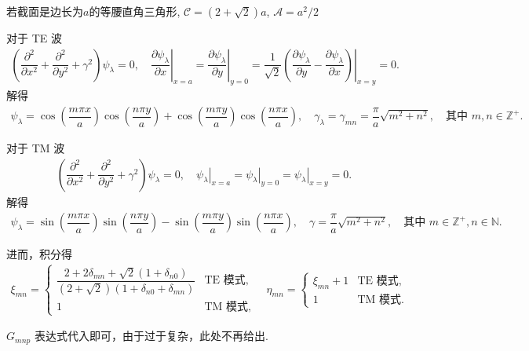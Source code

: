 \begin{exbox}
	若截面是边长为\(a\)的等腰直角三角形,  \(\mathcal{C} = (2 + \sqrt{2})a\), \(\mathcal{A} = a^2/2\)

	对于 TE 波
	\begin{align*}
		\left( \dfrac{\partial^2}{\partial x^2} + \dfrac{\partial^2}{\partial y^2} + \gamma^2 \right) \psi_\lambda = 0, \quad \left. \dfrac{\partial \psi_\lambda}{\partial x} \right|_{x=a} = \left. \dfrac{\partial \psi_\lambda}{\partial y} \right|_{y=0} = \left. \dfrac{1}{\sqrt{2}} \left( \dfrac{\partial \psi_\lambda}{\partial y} - \dfrac{\partial \psi_\lambda}{\partial x} \right) \right|_{x=y} = 0.
	\end{align*}
	解得
	\begin{align*}
		\psi_\lambda = \cos\left( \dfrac{m\pi x}{a} \right) \cos\left( \dfrac{n\pi y}{a} \right) + \cos\left( \dfrac{m\pi y}{a} \right) \cos\left( \dfrac{n\pi x}{a} \right), \quad \gamma_\lambda = \gamma_{mn} = \dfrac{\pi}{a} \sqrt{m^2 + n^2}, \quad \text{其中 } m, n \in \mathbb{Z}^+.
	\end{align*}

	对于 TM 波
	\begin{align*}
		\left( \dfrac{\partial^2}{\partial x^2} + \dfrac{\partial^2}{\partial y^2} + \gamma^2 \right) \psi_\lambda = 0, \quad \left. \psi_\lambda \right|_{x=a} = \left. \psi_\lambda \right|_{y=0} = \left. \psi_\lambda \right|_{x=y} = 0.
	\end{align*}
	解得
	\begin{align*}
		\psi_\lambda = \sin\left( \dfrac{m\pi x}{a} \right) \sin\left( \dfrac{n\pi y}{a} \right) - \sin\left( \dfrac{m\pi y}{a} \right) \sin\left( \dfrac{n\pi x}{a} \right), \quad \gamma = \dfrac{\pi}{a} \sqrt{m^2 + n^2}, \quad \text{其中 } m \in \mathbb{Z}^+, n \in \mathbb{N}.
	\end{align*}

	进而，积分得
	\begin{align*}
		\xi_{mn} =
		\begin{cases}
			\dfrac{2 + 2\delta_{mn} + \sqrt{2} \left( 1 + \delta_{n0} \right)}{\left( 2 + \sqrt{2} \right) \left( 1 + \delta_{n0} + \delta_{mn} \right)} & \text{TE 模式}, \\[8pt]
			1                                                                                                                                            & \text{TM 模式},
		\end{cases}
		\quad
		\eta_{mn} =
		\begin{cases}
			\xi_{mn} + 1 & \text{TE 模式}, \\[8pt]
			1            & \text{TM 模式}.
		\end{cases}
	\end{align*}

	\(G_{mnp}\) 表达式代入即可，由于过于复杂，此处不再给出.
\end{exbox}

